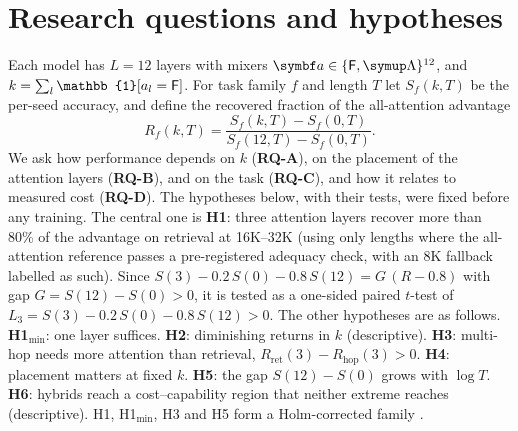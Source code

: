 \documentclass[10pt,a4paper]{article}
\begin{document}
\section{Research questions and hypotheses}
Each model has $L=12$ layers with mixers $\vect{a}\in\{\Full,\Lin\}^{12}$, and $k=\sum_l\mathbb{1}[a_l=\Full]$.
For task family $f$ and length $T$ let $S_f(k,T)$ be the per-seed accuracy, and define the recovered
fraction of the all-attention advantage
\begin{equation}\label{eq:rec}
  R_f(k,T)=\frac{S_f(k,T)-S_f(0,T)}{S_f(12,T)-S_f(0,T)} .
\end{equation}
We ask how performance depends on $k$ (\textbf{RQ-A}), on the placement of the attention layers
(\textbf{RQ-B}), and on the task (\textbf{RQ-C}), and how it relates to measured cost (\textbf{RQ-D}). The
hypotheses below, with their tests, were fixed before any training. The central one is
\textbf{H1}: three attention layers recover more than 80\% of the advantage on retrieval at 16K--32K (using only
lengths where the all-attention reference passes a pre-registered adequacy check, with an 8K fallback labelled as such). Since
$S(3)-0.2\,S(0)-0.8\,S(12)=G\,(R-0.8)$ with gap $G=S(12)-S(0)>0$, it is tested as a one-sided paired $t$-test of
$L_3=S(3)-0.2\,S(0)-0.8\,S(12)>0$. The other hypotheses are as follows.
\textbf{H1$_{\min}$}: one layer suffices.
\textbf{H2}: diminishing returns in $k$ (descriptive).
\textbf{H3}: multi-hop needs more attention than retrieval, $R_{\text{ret}}(3)-R_{\text{hop}}(3)>0$.
\textbf{H4}: placement matters at fixed $k$.
\textbf{H5}: the gap $S(12)-S(0)$ grows with $\log T$.
\textbf{H6}: hybrids reach a cost--capability region that neither extreme reaches (descriptive).
H1, H1$_{\min}$, H3 and H5 form a Holm-corrected family \citep{holm1979simple}.

\end{document}
